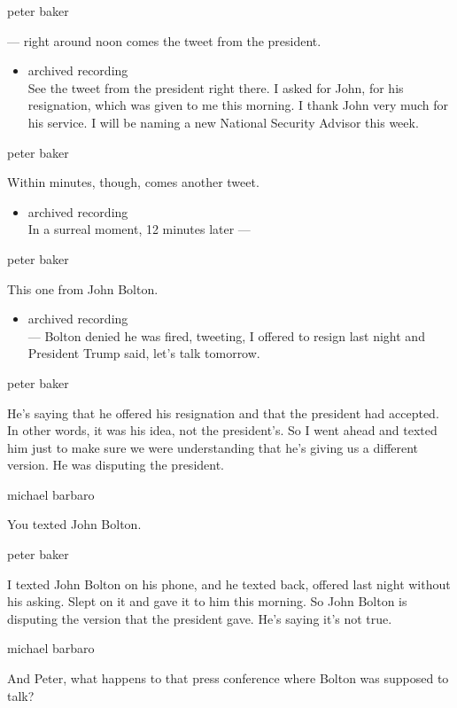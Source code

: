 peter baker

--- right around noon comes the tweet from the president.

\begin{itemize}
\tightlist
\item
  archived recording\\
  See the tweet from the president right there. I asked for John, for
  his resignation, which was given to me this morning. I thank John very
  much for his service. I will be naming a new National Security Advisor
  this week.
\end{itemize}

peter baker

Within minutes, though, comes another tweet.

\begin{itemize}
\tightlist
\item
  archived recording\\
  In a surreal moment, 12 minutes later ---
\end{itemize}

peter baker

This one from John Bolton.

\begin{itemize}
\tightlist
\item
  archived recording\\
  --- Bolton denied he was fired, tweeting, I offered to resign last
  night and President Trump said, let's talk tomorrow.
\end{itemize}

peter baker

He's saying that he offered his resignation and that the president had
accepted. In other words, it was his idea, not the president's. So I
went ahead and texted him just to make sure we were understanding that
he's giving us a different version. He was disputing the president.

michael barbaro

You texted John Bolton.

peter baker

I texted John Bolton on his phone, and he texted back, offered last
night without his asking. Slept on it and gave it to him this morning.
So John Bolton is disputing the version that the president gave. He's
saying it's not true.

michael barbaro

And Peter, what happens to that press conference where Bolton was
supposed to talk?

